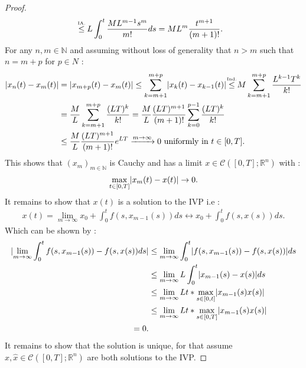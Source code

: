 \begin{proof}[Proof]
\begin{align*}
                                &\myS{IA.}{\le } L \int_0^{t} \frac{M L^{m-1} s^{m}  }{m!} ds = ML^{m}  \frac{t^{m+1} }{(m+1)!}
  .\end{align*}
  For any $n,m \in  \mathbb{N}$ and assuming without loss of generality that  $n>m$ such that $n = m+p$ for $p \in  N$ : 
  \begin{align*}
    \abs{x_{n}(t) - x_{m}(t)} &= \abs{x_{m+p}(t) - x_{m}(t)} \le  \sum_{k=m+1}^{m+p}  \abs{x_k(t)-x_{k-1}(t)} \myS{Ind.}{\le } M \sum_{k=m+1}^{m+p}  \frac{L^{k-1 }T^{k}  }{k!}\\
                              &= \frac{M}{L} \sum_{k=m+1}^{m+p} \frac{(LT)^{k} }{k!}  = \frac{M}{L} \frac{(LT)^{m+1} }{(m+1)!}\sum_{k=0}^{p-1} \frac{(LT)^{k} }{k!}  \\
                              &\le \frac{M}{L} \frac{(LT)^{m+1} }{(m+1)!} e^{LT}  \xrightarrow{m\to \infty} 0 \text{  uniformly in } t \in  [0,T]
  .\end{align*}
  This shows that $(x_m)_{m \in  \mathbb{N}}$  is Cauchy and has a limit $x \in  \mathcal{C}([0,T];\mathbb{R}^{n} )$ with : 
  \begin{align*}
    \max_{t \in  [0,T]} \lvert x_m(t) - x(t)\rvert \to  0
  .\end{align*}
  It remains to show that $x(t)$ is a solution to the IVP i.e : 
  \begin{align*}
    x(t) =  \lim_{m\to \infty} x_0 + \int_0^{t} f(s,x_{m-1}(s)) ds  \leftrightarrow x_0 + \int_0^{t} f(s,x(s)) ds 
  .\end{align*}
 Which can be shown by : 
 \begin{align*}
   \abs{\lim_{m \to \infty} \int_0^{t} f(s,x_{m-1}(s))  - f(s,x(s)) ds } &\le  \lim_{m \to  \infty} \int_0^{t} \abs{f(s,x_{m-1}(s))-f(s,x(s))} ds \\
                                                                         &\le  \lim_{m \to \infty} L \int_0^{t} \abs{x_{m-1}(s)-x(s)} ds \\
                                                                         &\le  \lim_{m \to \infty} L t*\max_{s \in [0,t]} \abs{x_{m-1}(s) x(s)}\\
                                                                         &\le   \lim_{m \to \infty} L t*\max_{s \in [0,T]} \abs{x_{m-1}(s) x(s)}\\
                                                                         = 0 
 .\end{align*}
 It remains to show that the solution is unique, for that assume $x,\hat{x}  \in  \mathcal{C}([0,T];\mathbb{R}^{n} )$ are both solutions to the IVP.

\end{proof}
